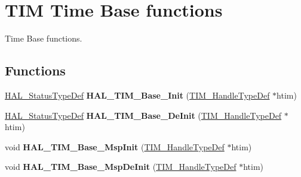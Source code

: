 \hypertarget{group___t_i_m___exported___functions___group1}{}\section{T\+IM Time Base functions}
\label{group___t_i_m___exported___functions___group1}


Time Base functions.  


\subsection*{Functions}
\begin{DoxyCompactItemize}
\item 
\mbox{\label{group___t_i_m___exported___functions___group1_ga1b288eb68eb52c97b8d187cdd6e9088f}} 
\mbox{\hyperlink{stm32f7xx__hal__def_8h_a63c0679d1cb8b8c684fbb0632743478f}{H\+A\+L\+\_\+\+Status\+Type\+Def}} {\bfseries H\+A\+L\+\_\+\+T\+I\+M\+\_\+\+Base\+\_\+\+Init} (\mbox{\hyperlink{struct_t_i_m___handle_type_def}{T\+I\+M\+\_\+\+Handle\+Type\+Def}} $\ast$htim)
\item 
\mbox{\label{group___t_i_m___exported___functions___group1_gaaf97adbc39e48456a1c83c54895de83b}} 
\mbox{\hyperlink{stm32f7xx__hal__def_8h_a63c0679d1cb8b8c684fbb0632743478f}{H\+A\+L\+\_\+\+Status\+Type\+Def}} {\bfseries H\+A\+L\+\_\+\+T\+I\+M\+\_\+\+Base\+\_\+\+De\+Init} (\mbox{\hyperlink{struct_t_i_m___handle_type_def}{T\+I\+M\+\_\+\+Handle\+Type\+Def}} $\ast$htim)
\item 
\mbox{\label{group___t_i_m___exported___functions___group1_ga818f4d5d1e2f417438d281b4ac9efb9c}} 
void {\bfseries H\+A\+L\+\_\+\+T\+I\+M\+\_\+\+Base\+\_\+\+Msp\+Init} (\mbox{\hyperlink{struct_t_i_m___handle_type_def}{T\+I\+M\+\_\+\+Handle\+Type\+Def}} $\ast$htim)
\item 
\mbox{\label{group___t_i_m___exported___functions___group1_ga13352a6c9cb3225511e5f29dbb894e84}} 
void {\bfseries H\+A\+L\+\_\+\+T\+I\+M\+\_\+\+Base\+\_\+\+Msp\+De\+Init} (\mbox{\hyperlink{struct_t_i_m___handle_type_def}{T\+I\+M\+\_\+\+Handle\+Type\+Def}} $\ast$htim)
\item 
\mbox{\label{group___t_i_m___exported___functions___group1_gaf7e5ee80207a338050413e14f7bd24f9}} 

\end{DoxyCompactItemize}
